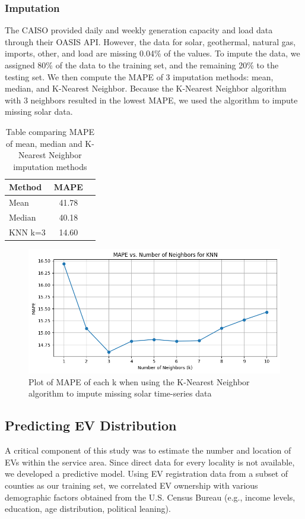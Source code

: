 \documentclass[12pt, letterpaper]{article}
\begin{document}
\subsubsection{Imputation}
The CAISO provided daily and weekly generation capacity and load data through their OASIS API. However, the data for solar, geothermal, natural gas, imports, other, and load are missing 0.04\% of the values. To impute the data, we assigned 80\% of the data to the training set, and the remaining 20\% to the testing set. We then compute the MAPE of 3 imputation methods: mean, median, and K-Nearest Neighbor. Because the K-Nearest Neighbor algorithm with 3 neighbors resulted in the lowest MAPE, we used the algorithm to impute missing solar data. 
\begin{table}[H]
\centering
\caption{Table comparing MAPE of mean, median and K-Nearest Neighbor imputation methods}
\label{tab:mape_solar}
\begin{tabular}{@{}lcc@{}}
\toprule
\textbf{Method} & \textbf{MAPE}  \\ \midrule
Mean        & 41.78 \\
Median      & 40.18 \\
KNN k=3     & 14.60  \\
\bottomrule
\end{tabular}
\end{table}

\begin{figure}[h]
    \centering
    \includegraphics[width=\textwidth]{solar_knn.png}
    \caption{Plot of MAPE of each k when using the K-Nearest Neighbor algorithm to impute missing solar time-series data}
    \label{fig:solar_knn}
\end{figure}

\subsection{Predicting EV Distribution}
A critical component of this study was to estimate the number and location of EVs within the service area. Since direct data for every locality is not available, we developed a predictive model. Using EV registration data from a subset of counties as our training set, we correlated EV ownership with various demographic factors obtained from the U.S. Census Bureau (e.g., income levels, education, age distribution, political leaning).
\end{document}
